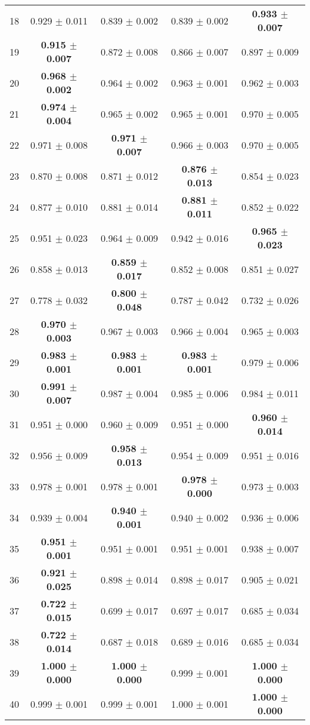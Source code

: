 \begin{table}[!ht]
{\begin{tabular}{r c c c c}
18 & 0.929 $\pm$ 0.011 & 0.839 $\pm$ 0.002 & 0.839 $\pm$ 0.002 & \textbf{0.933 $\pm$ 0.007} \\
19 & \textbf{0.915 $\pm$ 0.007} & 0.872 $\pm$ 0.008 & 0.866 $\pm$ 0.007 & 0.897 $\pm$ 0.009 \\
20 & \textbf{0.968 $\pm$ 0.002} & 0.964 $\pm$ 0.002 & 0.963 $\pm$ 0.001 & 0.962 $\pm$ 0.003 \\
21 & \textbf{0.974 $\pm$ 0.004} & 0.965 $\pm$ 0.002 & 0.965 $\pm$ 0.001 & 0.970 $\pm$ 0.005 \\
22 & 0.971 $\pm$ 0.008 & \textbf{0.971 $\pm$ 0.007} & 0.966 $\pm$ 0.003 & 0.970 $\pm$ 0.005 \\
23 & 0.870 $\pm$ 0.008 & 0.871 $\pm$ 0.012 & \textbf{0.876 $\pm$ 0.013} & 0.854 $\pm$ 0.023 \\
24 & 0.877 $\pm$ 0.010 & 0.881 $\pm$ 0.014 & \textbf{0.881 $\pm$ 0.011} & 0.852 $\pm$ 0.022 \\
25 & 0.951 $\pm$ 0.023 & 0.964 $\pm$ 0.009 & 0.942 $\pm$ 0.016 & \textbf{0.965 $\pm$ 0.023} \\
26 & 0.858 $\pm$ 0.013 & \textbf{0.859 $\pm$ 0.017} & 0.852 $\pm$ 0.008 & 0.851 $\pm$ 0.027 \\
27 & 0.778 $\pm$ 0.032 & \textbf{0.800 $\pm$ 0.048} & 0.787 $\pm$ 0.042 & 0.732 $\pm$ 0.026 \\
28 & \textbf{0.970 $\pm$ 0.003} & 0.967 $\pm$ 0.003 & 0.966 $\pm$ 0.004 & 0.965 $\pm$ 0.003 \\
29 & \textbf{0.983 $\pm$ 0.001} & \textbf{0.983 $\pm$ 0.001} & \textbf{0.983 $\pm$ 0.001} & 0.979 $\pm$ 0.006 \\
30 & \textbf{0.991 $\pm$ 0.007} & 0.987 $\pm$ 0.004 & 0.985 $\pm$ 0.006 & 0.984 $\pm$ 0.011 \\
31 & 0.951 $\pm$ 0.000 & 0.960 $\pm$ 0.009 & 0.951 $\pm$ 0.000 & \textbf{0.960 $\pm$ 0.014} \\
32 & 0.956 $\pm$ 0.009 & \textbf{0.958 $\pm$ 0.013} & 0.954 $\pm$ 0.009 & 0.951 $\pm$ 0.016 \\
33 & 0.978 $\pm$ 0.001 & 0.978 $\pm$ 0.001 & \textbf{0.978 $\pm$ 0.000} & 0.973 $\pm$ 0.003 \\
34 & 0.939 $\pm$ 0.004 & \textbf{0.940 $\pm$ 0.001} & 0.940 $\pm$ 0.002 & 0.936 $\pm$ 0.006 \\
35 & \textbf{0.951 $\pm$ 0.001} & 0.951 $\pm$ 0.001 & 0.951 $\pm$ 0.001 & 0.938 $\pm$ 0.007 \\
36 & \textbf{0.921 $\pm$ 0.025} & 0.898 $\pm$ 0.014 & 0.898 $\pm$ 0.017 & 0.905 $\pm$ 0.021 \\
37 & \textbf{0.722 $\pm$ 0.015} & 0.699 $\pm$ 0.017 & 0.697 $\pm$ 0.017 & 0.685 $\pm$ 0.034 \\
38 & \textbf{0.722 $\pm$ 0.014} & 0.687 $\pm$ 0.018 & 0.689 $\pm$ 0.016 & 0.685 $\pm$ 0.034 \\
39 & \textbf{1.000 $\pm$ 0.000} & \textbf{1.000 $\pm$ 0.000} & 0.999 $\pm$ 0.001 & \textbf{1.000 $\pm$ 0.000} \\
40 & 0.999 $\pm$ 0.001 & 0.999 $\pm$ 0.001 & 1.000 $\pm$ 0.001 & \textbf{1.000 $\pm$ 0.000} \\
\end{tabular}}
\end{table}
